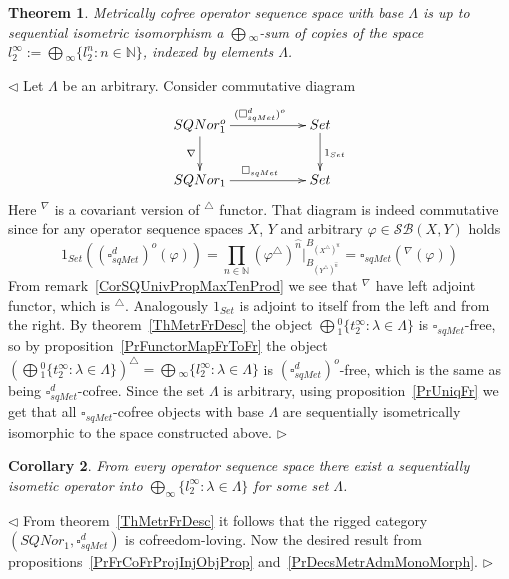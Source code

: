 \documentclass[12pt]{article}
\newtheorem{theorem}{Theorem}[subsection]
\newtheorem{corollary}[theorem]{Corollary}
\newenvironment{proof}{\par $\triangleleft$}{$\triangleright$}
\begin{document}
\begin{theorem}\label{ThMetCoFrDesc}
Metrically cofree operator sequence space with base $\Lambda$ is up to 
sequential isometric isomorphism  a $\bigoplus{}_\infty$-sum of copies of 
the space $l_2^\infty:=\bigoplus{}_\infty \{l_2^n:n\in\mathbb{N} \}$, indexed 
by elements $\Lambda$.
\end{theorem}
\begin{proof}
Let $\Lambda$ be an arbitrary. Consider commutative diagram
$$
\xymatrix{SQNor_1^o 
\ar[d]_{\nabla } \ar[rr]^{(\square_{sqMet}^{d})^o} & &  %
{Set}\ar[d]^{1_{Set}} \\  %
SQNor_1\ar[rr]^{\square_{sqMet}}&  &{Set}}  %
$$
Here ${}^\nabla$ is a covariant version of ${}^\triangle$ functor. That diagram 
is indeed commutative since for any operator sequence spaces $X$, $Y$ and 
arbitrary $\varphi\in\mathcal{SB}(X,Y)$ holds
$$
1_{Set}({(\square_{sqMet}^d)}^o(\varphi))
=\prod\limits_{n\in\mathbb{N}}
{(\varphi^\triangle )}^{\wideparen{n}}|_{
    B_{{(Y^\triangle)}^{\wideparen{n}}}
}^{
    B_{{(X^\triangle )}^{\wideparen{n}}}
}
=\square_{sqMet}({}^\nabla(\varphi))
$$
From remark~\ref{CorSQUnivPropMaxTenProd} we see that ${}^\nabla$ have left 
adjoint functor, which is  ${}^\triangle$. Analogously $1_{Set}$ is adjoint 
to itself from the left and from the right. 
By theorem~\ref{ThMetrFrDesc} 
the object $\bigoplus{}_1^0 \{t_2^\infty:\lambda\in\Lambda \}$ 
is  $\square_{sqMet}$-free, so by proposition~\ref{PrFunctorMapFrToFr} 
the object 
${(\bigoplus{}_1^0 \{t_2^\infty:\lambda\in\Lambda \})}^\triangle
=\bigoplus{}_\infty \{l_2^\infty:\lambda\in\Lambda \}$ 
is ${(\square_{sqMet}^d)}^o$-free, which is the same 
as being $\square_{sqMet}^d$-cofree. Since the set $\Lambda$ is arbitrary, 
using proposition~\ref{PrUniqFr} we get that all $\square_{sqMet}$-cofree 
objects with base $\Lambda$ are sequentially isometrically isomorphic to 
the space constructed above.
\end{proof}

\begin{corollary}\label{CorSQSpaceIsFromMetrAdmMonoMorph}
From every operator sequence space there exist a sequentially isometic 
operator into $\bigoplus_\infty \{l_2^\infty:\lambda\in\Lambda \}$  for 
some set $\Lambda$.
\end{corollary}
\begin{proof}
From theorem~\ref{ThMetrFrDesc} it follows that the rigged 
category $(SQNor_1,\square_{sqMet}^d)$ is cofreedom-loving. Now the desired 
result from propositions~\ref{PrFrCoFrProjInjObjProp} 
and~\ref{PrDecsMetrAdmMonoMorph}.
\end{proof}
\end{document}
